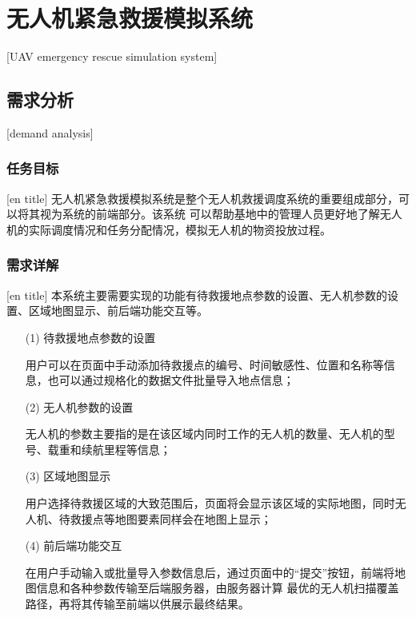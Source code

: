 
\chapter{无人机紧急救援模拟系统}[UAV emergency rescue simulation system]

\section{需求分析}[demand analysis]

\subsection{任务目标}[en title]
无人机紧急救援模拟系统是整个无人机救援调度系统的重要组成部分，可以将其视为系统的前端部分。该系统
可以帮助基地中的管理人员更好地了解无人机的实际调度情况和任务分配情况，模拟无人机的物资投放过程。
\subsection{需求详解}[en title]
本系统主要需要实现的功能有待救援地点参数的设置、无人机参数的设置、区域地图显示、前后端功能交互等。
\begin{itemize}
	\item [(1)] 待救援地点参数的设置


    \qquad 用户可以在页面中手动添加待救援点的编号、时间敏感性、位置和名称等信息，也可以通过规格化的数据文件批量导入地点信息；
    \item [(2)] 无人机参数的设置
    

    \qquad 无人机的参数主要指的是在该区域内同时工作的无人机的数量、无人机的型号、载重和续航里程等信息；
    \item [(3)] 区域地图显示
    

    \qquad 用户选择待救援区域的大致范围后，页面将会显示该区域的实际地图，同时无人机、待救援点等地图要素同样会在地图上显示；

    \item [(4)] 前后端功能交互
    

    \qquad 在用户手动输入或批量导入参数信息后，通过页面中的“提交”按钮，前端将地图信息和各种参数传输至后端服务器，由服务器计算
    最优的无人机扫描覆盖路径，再将其传输至前端以供展示最终结果。
\end{itemize}
